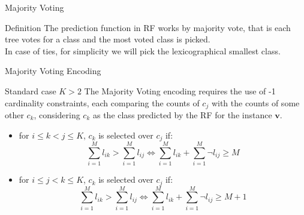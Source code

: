 \begin{frame}{Majority Voting}
    \begin{block}{Definition}
    The prediction function in RF works by majority vote, that is each tree votes for a class and the most voted class is picked. \\
    In case of ties, for simplicity we will pick the lexicographical smallest class.
    \end{block}
\end{frame}

\begin{frame}{Majority Voting Encoding}
    \begin{block}{Standard case $\textit{K}>2$}
    The Majority Voting encoding requires the use of -1 cardinality constraints, each comparing the counts of $c_{j}$ with the counts of some other $c_{k}$, considering $c_{k}$ as the class predicted by the RF for the instance $\mathbf{v}$.\\

    \begin{itemize}
        \item for $i \leq k < j \leq K$, $c_{k}$ is selected over $c_{j}$ if:
        \begin{equation*}
            \sum_{i=1}^{M} l_{ik} > \sum_{i=1}^{M} l_{ij} \iff \sum_{i=1}^{M} l_{ik} + \sum_{i=1}^{M} \neg l_{ij} \geq M
        \end{equation*}
        \item for $i \leq j < k \leq K$, $c_{k}$ is selected over $c_{j}$ if:
        \begin{equation*}
            \sum_{i=1}^{M} l_{ik} > \sum_{i=1}^{M} l_{ij} \iff \sum_{i=1}^{M} l_{ik} + \sum_{i=1}^{M} \neg l_{ij} \geq M+1
        \end{equation*}
    \end{itemize}
    \end{block}
\end{frame}


